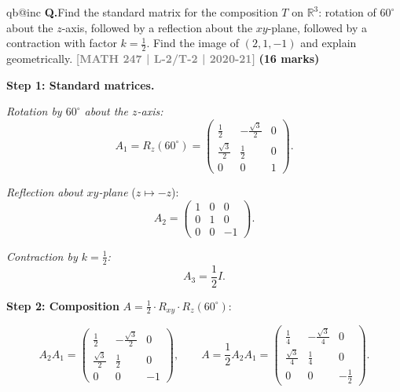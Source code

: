 \documentclass[12pt,a3paper]{article}
\makeatletter
\newcommand{\yr}[1]{\hfill\textcolor{gray}{\small\textbf{[#1]}}}
\newcommand{\mk}[1]{\textcolor{orange!70!black}{\small\textbf{(#1 marks)}}}
\newcounter{qnum}
\newcommand{\Q}[1]{%
  \csname qb@inc\endcsname
  \needspace{4\baselineskip}
  \refstepcounter{qnum}
  \vspace{6pt}
  \noindent\textbf{Q\theqnum.}\enspace #1\par
}
\makeatother
\begin{document}
\Q{Find the standard matrix for the composition $T$ on $\mathbb{R}^3$: rotation of $60^\circ$ about the $z$-axis, followed by a reflection about the $xy$-plane, followed by a contraction with factor $k = \frac{1}{2}$. Find the image of $(2,1,-1)$ and explain geometrically.
\yr{MATH 247 | L-2/T-2 | 2020-21} \mk{16}}


\begin{tcolorbox}[enhanced,breakable,
  colback=cF!4,colframe=cF,boxrule=0.8pt,arc=5pt,
  title={\textbf{Answer --- Composition: Rot$(60^\circ,z)$ $\to$ Reflect$(xy)$ $\to$ Contraction$(\frac{1}{2})$; $T(2,1,-1)$}},
  fonttitle=\bfseries\color{white},colbacktitle=cF]

\textbf{Step 1: Standard matrices.}

\textit{Rotation by $60^\circ$ about the $z$-axis:}
\[
A_1=R_z(60^\circ)=\begin{pmatrix}\frac{1}{2}&-\frac{\sqrt{3}}{2}&0\\\frac{\sqrt{3}}{2}&\frac{1}{2}&0\\0&0&1\end{pmatrix}.
\]

\textit{Reflection about $xy$-plane} ($z\mapsto -z$):
\[
A_2=\begin{pmatrix}1&0&0\\0&1&0\\0&0&-1\end{pmatrix}.
\]

\textit{Contraction by $k=\tfrac{1}{2}$:}
\[
A_3=\frac{1}{2}I.
\]

\textbf{Step 2: Composition} $A=\frac{1}{2}\cdot R_{xy}\cdot R_z(60^\circ)$:

\[
A_2A_1=\begin{pmatrix}\frac{1}{2}&-\frac{\sqrt{3}}{2}&0\\\frac{\sqrt{3}}{2}&\frac{1}{2}&0\\0&0&-1\end{pmatrix},
\qquad
A=\frac{1}{2}A_2A_1=\begin{pmatrix}\frac{1}{4}&-\frac{\sqrt{3}}{4}&0\\[4pt]\frac{\sqrt{3}}{4}&\frac{1}{4}&0\\0&0&-\frac{1}{2}\end{pmatrix}.
\]


\end{tcolorbox}
\end{document}
